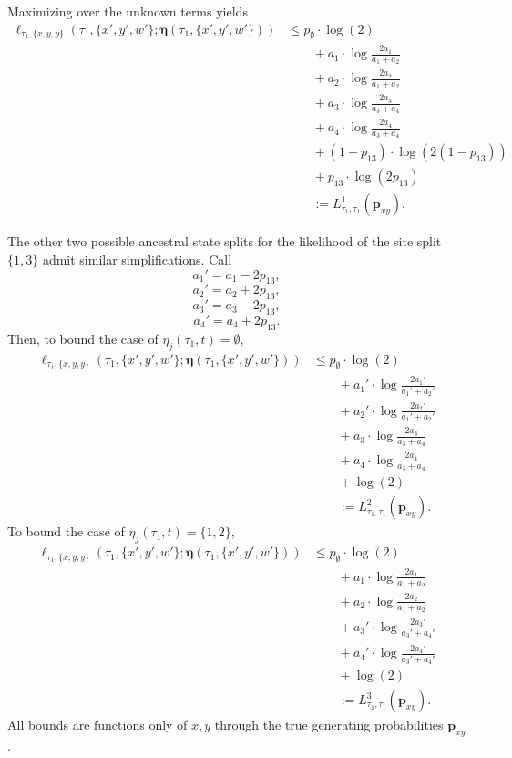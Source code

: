 \documentclass{article}
\newcommand{\ancestralSplitPartition}{\eta}
\newcommand{\fullAncestralSplitPartitions}{\boldsymbol\eta}
\begin{document}
Maximizing over the unknown terms yields
\begin{align*}
    \ell_{\tau_1,\{x,y,y\}}(\tau_1, \{x',y',w'\}; \fullAncestralSplitPartitions(\tau_1,\{x',y',w'\}))
    &\le      p_{\emptyset}  \cdot\log(2) \\
    &\qquad + a_{1}\cdot\log\frac{2a_{1}}{a_{1}+a_{2}} \\
    &\qquad + a_{2}\cdot\log\frac{2a_{2}}{a_{1}+a_{2}} \\
    &\qquad + a_{3}\cdot\log\frac{2a_{3}}{a_{3}+a_{4}} \\
    &\qquad + a_{4}\cdot\log\frac{2a_{4}}{a_{3}+a_{4}} \\
    &\qquad + (1-p_{13})\cdot\log(2(1-p_{13})) \\
    &\qquad + p_{13}\cdot\log(2p_{13}) \\
    &\qquad := L^{1}_{\tau_1,\tau_1}(\mathbf{p}_{xy}).
\end{align*}

The other two possible ancestral state splits for the likelihood of the site split $\{1,3\}$ admit similar simplifications.
Call
$$
a_{1}' = a_{1}-2p_{13},
$$
$$
a_{2}' = a_{2}+2p_{13},
$$
$$
a_{3}' = a_{3}-2p_{13},
$$
$$
a_{4}' = a_{4}+2p_{13}.
$$
Then, to bound the case of $\ancestralSplitPartition_j(\tau_1, t) = \emptyset$,
\begin{align*}
    \ell_{\tau_1,\{x,y,y\}}(\tau_1, \{x',y',w'\}; \fullAncestralSplitPartitions(\tau_1,\{x',y',w'\}))
    &\le      p_{\emptyset}  \cdot\log(2) \\
    &\qquad + a_{1}'\cdot\log\frac{2a_{1}'}{a_{1}'+a_{2}'} \\
    &\qquad + a_{2}'\cdot\log\frac{2a_{2}'}{a_{1}'+a_{2}'} \\
    &\qquad + a_{3}\cdot\log\frac{2a_{3}}{a_{3}+a_{4}} \\
    &\qquad + a_{4}\cdot\log\frac{2a_{4}}{a_{3}+a_{4}} \\
    &\qquad + \log(2) \\
    &\qquad := L^{2}_{\tau_1,\tau_1}(\mathbf{p}_{xy}).
\end{align*}
To bound the case of $\ancestralSplitPartition_j(\tau_1, t) = \{1,2\}$,
\begin{align*}
    \ell_{\tau_1,\{x,y,y\}}(\tau_1, \{x',y',w'\}; \fullAncestralSplitPartitions(\tau_1,\{x',y',w'\}))
    &\le      p_{\emptyset}  \cdot\log(2) \\
    &\qquad + a_{1}\cdot\log\frac{2a_{1}}{a_{1}+a_{2}} \\
    &\qquad + a_{2}\cdot\log\frac{2a_{2}}{a_{1}+a_{2}} \\
    &\qquad + a_{3}'\cdot\log\frac{2a_{3}'}{a_{3}'+a_{4}'} \\
    &\qquad + a_{4}'\cdot\log\frac{2a_{4}'}{a_{3}'+a_{4}'} \\
    &\qquad + \log(2) \\
    &\qquad := L^{3}_{\tau_1,\tau_1}(\mathbf{p}_{xy}).
\end{align*}
All bounds are functions only of $x,y$ through the true generating probabilities $\mathbf{p}_{xy}$.
\end{document}
